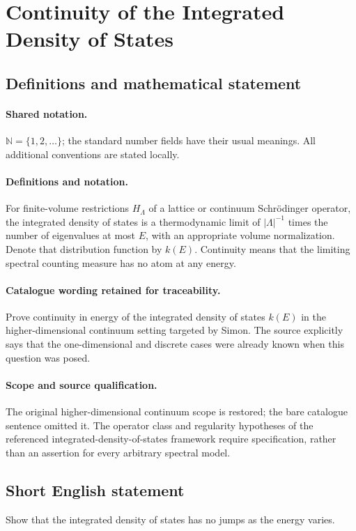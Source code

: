 \documentclass[11pt]{article}
\begin{document}
\section{Continuity of the Integrated Density of States}\label{statement}

\subsection{Definitions and mathematical statement}

\paragraph{Shared notation.}$\mathbb N=\{1,2,\ldots\}$; the standard number fields have their usual meanings. All additional conventions are stated locally.


\paragraph{Definitions and notation.}For finite-volume restrictions $H_\Lambda$ of a lattice or continuum Schrödinger operator, the integrated density of states is a thermodynamic limit of $|\Lambda|^{-1}$ times the number of eigenvalues at most $E$, with an appropriate volume normalization. Denote that distribution function by $k(E)$. Continuity means that the limiting spectral counting measure has no atom at any energy.

\paragraph{Catalogue wording retained for traceability.}
Prove continuity in energy of the integrated density of states $k(E)$ in the higher-dimensional continuum setting targeted by Simon. The source explicitly says that the one-dimensional and discrete cases were already known when this question was posed.
\paragraph{Scope and source qualification.}The original higher-dimensional continuum scope is restored; the bare catalogue sentence omitted it. The operator class and regularity hypotheses of the referenced integrated-density-of-states framework require specification, rather than an assertion for every arbitrary spectral model.
\subsection{Short English statement}
Show that the integrated density of states has no jumps as the energy varies.
\end{document}
